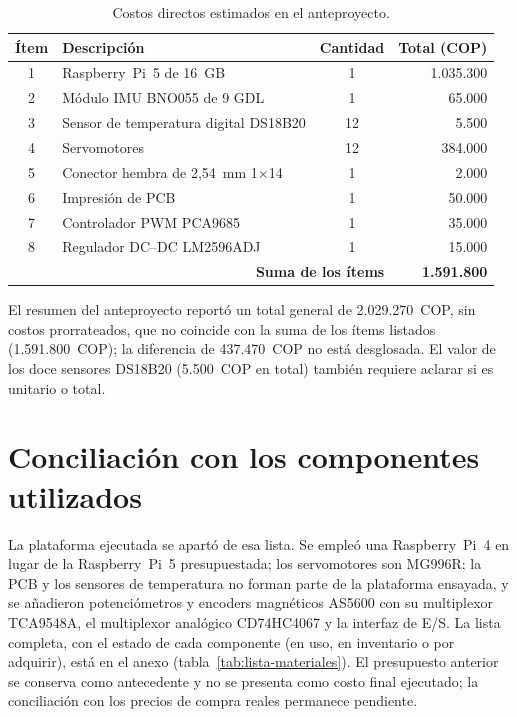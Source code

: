\begin{table}[H]
\centering
\caption{Costos directos estimados en el anteproyecto.}
\label{tab:costos_materiales}
\begin{tabular}{clcr}
\toprule
\textbf{Ítem} & \textbf{Descripción} & \textbf{Cantidad} & \textbf{Total (COP)} \\
\midrule
1 & Raspberry~Pi~5 de 16~GB & 1 & 1.035.300 \\
2 & Módulo IMU BNO055 de 9 GDL & 1 & 65.000 \\
3 & Sensor de temperatura digital DS18B20 & 12 & 5.500 \\
4 & Servomotores & 12 & 384.000 \\
5 & Conector hembra de 2,54~mm 1$\times$14 & 1 & 2.000 \\
6 & Impresión de PCB & 1 & 50.000 \\
7 & Controlador PWM PCA9685 & 1 & 35.000 \\
8 & Regulador DC--DC LM2596ADJ & 1 & 15.000 \\
\midrule
\multicolumn{3}{r}{\textbf{Suma de los ítems}} & \textbf{1.591.800} \\
\bottomrule
\end{tabular}
\end{table}

El resumen del anteproyecto reportó un total general de 2.029.270~COP, sin
costos prorrateados, que no coincide con la suma de los ítems listados
(1.591.800~COP); la diferencia de 437.470~COP no está desglosada. El valor de
los doce sensores DS18B20 (5.500~COP en total) también requiere aclarar si es
unitario o total.

\section{Conciliación con los componentes utilizados}

La plataforma ejecutada se apartó de esa lista. Se empleó una Raspberry~Pi~4 en
lugar de la Raspberry~Pi~5 presupuestada; los servomotores son MG996R; la PCB y los sensores de temperatura no forman parte
de la plataforma ensayada, y se añadieron
potenciómetros y encoders magnéticos AS5600 con su multiplexor TCA9548A, el
multiplexor analógico CD74HC4067 y la interfaz de E/S. La lista completa, con el
estado de cada componente (en uso, en inventario o por adquirir), está en el
anexo (tabla~\ref{tab:lista-materiales}). El presupuesto anterior se conserva
como antecedente y no se presenta como costo final ejecutado; la conciliación
con los precios de compra reales permanece pendiente.

